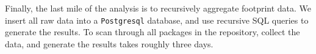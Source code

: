 








Finally, the last mile of the analysis is to recursively aggregate footprint data. We insert all raw data into a {\tt Postgresql} database, and 
use recursive SQL queries to generate the results. 
To scan through all \packagenum{} packages in the repository, collect the data, and generate the results takes roughly three days.

   



